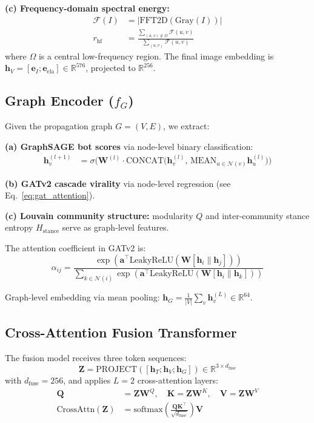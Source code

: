 \documentclass[11pt,a4paper]{article}
\begin{document}
\textbf{(c) Frequency-domain spectral energy:}
\begin{align}
  \mathcal{F}(I) &= \bigl|\text{FFT2D}(\text{Gray}(I))\bigr| \\
  r_\text{hf} &= \frac{\sum_{(u,v) \notin \Omega} \mathcal{F}(u,v)}{\sum_{(u,v)} \mathcal{F}(u,v)}
\end{align}
where $\Omega$ is a central low-frequency region. The final image
embedding is $\mathbf{h}_V = [\mathbf{e}_I; \mathbf{e}_\text{ela}] \in \mathbb{R}^{576}$, projected to $\mathbb{R}^{256}$.

\subsection{Graph Encoder ($f_G$)}

Given the propagation graph $G = (V, E)$, we extract:

\textbf{(a) GraphSAGE bot scores} via node-level binary classification:
\begin{align}
  \mathbf{h}^{(l+1)}_v &= \sigma\!\bigl(
    \mathbf{W}^{(l)} \cdot \text{CONCAT}\bigl(
      \mathbf{h}^{(l)}_v,\, \text{MEAN}_{u \in \mathcal{N}(v)} \mathbf{h}^{(l)}_u
    \bigr)
  \bigr)
\end{align}

\textbf{(b) GATv2 cascade virality} via node-level regression (see
Eq.~\ref{eq:gat_attention}).

\textbf{(c) Louvain community structure:} modularity $Q$ and inter-community
stance entropy $H_\text{stance}$ serve as graph-level features.

The attention coefficient in GATv2 is:
\begin{equation}
  \alpha_{ij} = \frac{\exp(\mathbf{a}^\top \text{LeakyReLU}(\mathbf{W}[\mathbf{h}_i \| \mathbf{h}_j]))}
                     {\sum_{k \in \mathcal{N}(i)} \exp(\mathbf{a}^\top \text{LeakyReLU}(\mathbf{W}[\mathbf{h}_i \| \mathbf{h}_k]))}
  \label{eq:gat_attention}
\end{equation}

Graph-level embedding via mean pooling: $\mathbf{h}_G = \frac{1}{|V|}\sum_v \mathbf{h}^{(L)}_v \in \mathbb{R}^{64}$.

\subsection{Cross-Attention Fusion Transformer}

The fusion model receives three token sequences:
\begin{equation}
  \mathbf{Z} = \text{PROJECT}([\mathbf{h}_T; \mathbf{h}_V; \mathbf{h}_G]) \in \mathbb{R}^{3 \times d_\text{fuse}}
\end{equation}
with $d_\text{fuse} = 256$, and applies $L=2$ cross-attention layers:
\begin{align}
  \mathbf{Q} &= \mathbf{Z} \mathbf{W}^Q, \quad \mathbf{K} = \mathbf{Z} \mathbf{W}^K, \quad \mathbf{V} = \mathbf{Z} \mathbf{W}^V \\
  \text{CrossAttn}(\mathbf{Z}) &= \text{softmax}\!\left(\frac{\mathbf{Q}\mathbf{K}^\top}{\sqrt{d_\text{fuse}}}\right)\mathbf{V}
\end{align}
\end{document}
